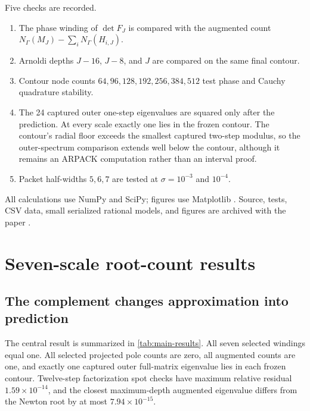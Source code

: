 \documentclass[11pt]{article}
\theoremstyle{definition}
\theoremstyle{remark}
\begin{document}
Five checks are recorded.

\begin{enumerate}
 \item The phase winding of $\det F_J$ is compared with the augmented count
 $N_\Gamma(M_J)-\sum_iN_\Gamma(H_{i,J})$.
 \item Arnoldi depths $J-16$, $J-8$, and $J$ are compared on the same final
 contour.
 \item Contour node counts $64,96,128,192,256,384,512$ test phase and Cauchy
 quadrature stability.
 \item The 24 captured outer one-step eigenvalues are squared only after the
 prediction.  At every scale exactly one lies in the frozen contour.  The
 contour's radial floor exceeds the smallest captured two-step modulus, so
 the outer-spectrum comparison extends well below the contour, although it
 remains an ARPACK computation rather than an interval proof.
 \item Packet half-widths $5,6,7$ are tested at $\sigma=10^{-3}$ and
 $10^{-4}$.
\end{enumerate}

All calculations use NumPy and SciPy; figures use Matplotlib
\citep{HarrisEtAl2020,VirtanenEtAl2020,Hunter2007}.  Source, tests, CSV data,
small serialized rational models, and figures are archived with the paper
\citep{WangContourFeshbachCode2026}.

\section{Seven-scale root-count results}
\label{sec:results}

\subsection{The complement changes approximation into prediction}

The central result is summarized in \cref{tab:main-results}.  All seven
selected windings equal one.  All selected projected pole counts are zero,
all augmented counts are one, and exactly one captured outer full-matrix
eigenvalue lies in each frozen contour.  Twelve-step factorization spot
checks have maximum relative residual $1.59\times10^{-14}$, and the closest
maximum-depth augmented eigenvalue differs from the Newton root by at most
$7.94\times10^{-15}$.
\end{document}

